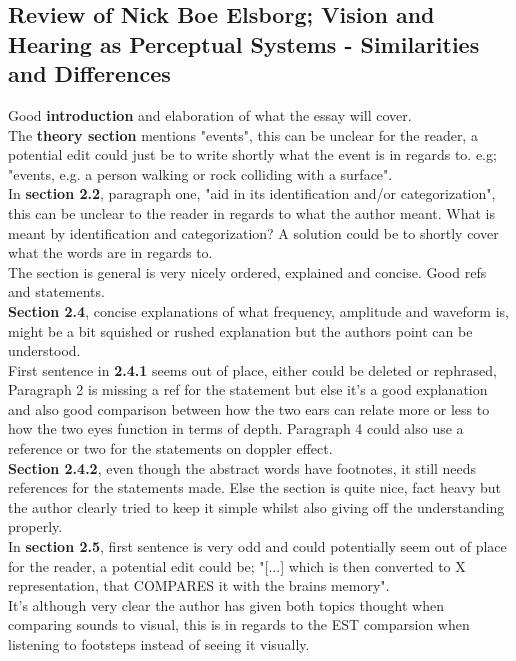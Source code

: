 \subsection{Review of Nick Boe Elsborg; Vision and Hearing as Perceptual Systems - Similarities and Differences}


Good \textbf{introduction} and elaboration of what the essay will cover.\\
The \textbf{theory section} mentions "events", this can be unclear for the reader, a potential edit could just be to write shortly what the event is in regards to. e.g; "events, e.g. a person walking or rock colliding with a surface".\medskip \\
In \textbf{section 2.2}, paragraph one, "aid in its identification and/or categorization", this can be unclear to the reader in regards to what the author meant. What is meant by identification and categorization? A solution could be to shortly cover what the words are in regards to.\\The section is general is very nicely ordered, explained and concise. Good refs and statements.\medskip \\
\textbf{Section 2.4}, concise explanations of what frequency, amplitude and waveform is, might be a bit squished or rushed explanation but the authors point can be understood.\\First sentence in \textbf{2.4.1} seems out of place, either could be deleted or rephrased, Paragraph 2 is missing a ref for the statement but else it's a good explanation and also good comparison between how the two ears can relate more or less to how the two eyes function in terms of depth. Paragraph 4 could also use a reference or two for the statements on doppler effect.\\\textbf{Section 2.4.2}, even though the abstract words have footnotes, it still needs references for the statements made. Else the section is quite nice, fact heavy but the author clearly tried to keep it simple whilst also giving off the understanding properly.\medskip \\
In \textbf{section 2.5}, first sentence is very odd and could potentially seem out of place for the reader, a potential edit could be; "[...] which is then converted to X representation, that COMPARES it with the brains memory".\\It's although very clear the author has given both topics thought when comparing sounds to visual, this is in regards to the EST comparsion when listening to footsteps instead of seeing it visually.\medskip \\
